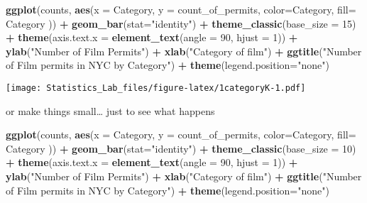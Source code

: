 \documentclass[
]{book}
\newenvironment{Shaded}{\begin{snugshade}}{\end{snugshade}}
\newcommand{\AttributeTok}[1]{\textcolor[rgb]{0.13,0.29,0.53}{#1}}
\newcommand{\DecValTok}[1]{\textcolor[rgb]{0.00,0.00,0.81}{#1}}
\newcommand{\FunctionTok}[1]{\textcolor[rgb]{0.13,0.29,0.53}{\textbf{#1}}}
\newcommand{\NormalTok}[1]{#1}
\newcommand{\SpecialCharTok}[1]{\textcolor[rgb]{0.81,0.36,0.00}{\textbf{#1}}}
\newcommand{\StringTok}[1]{\textcolor[rgb]{0.31,0.60,0.02}{#1}}
\begin{document}
\begin{Shaded}
\begin{Highlighting}[]
\FunctionTok{ggplot}\NormalTok{(counts, }\FunctionTok{aes}\NormalTok{(}\AttributeTok{x =}\NormalTok{ Category, }\AttributeTok{y =}\NormalTok{ count\_of\_permits, }
                   \AttributeTok{color=}\NormalTok{Category, }
                   \AttributeTok{fill=}\NormalTok{ Category )) }\SpecialCharTok{+}
  \FunctionTok{geom\_bar}\NormalTok{(}\AttributeTok{stat=}\StringTok{"identity"}\NormalTok{) }\SpecialCharTok{+} 
  \FunctionTok{theme\_classic}\NormalTok{(}\AttributeTok{base\_size =} \DecValTok{15}\NormalTok{) }\SpecialCharTok{+}
  \FunctionTok{theme}\NormalTok{(}\AttributeTok{axis.text.x =} \FunctionTok{element\_text}\NormalTok{(}\AttributeTok{angle =} \DecValTok{90}\NormalTok{, }\AttributeTok{hjust =} \DecValTok{1}\NormalTok{)) }\SpecialCharTok{+}
  \FunctionTok{ylab}\NormalTok{(}\StringTok{"Number of Film Permits"}\NormalTok{) }\SpecialCharTok{+} 
  \FunctionTok{xlab}\NormalTok{(}\StringTok{"Category of film"}\NormalTok{) }\SpecialCharTok{+}
  \FunctionTok{ggtitle}\NormalTok{(}\StringTok{"Number of Film permits in NYC by Category"}\NormalTok{) }\SpecialCharTok{+}
  \FunctionTok{theme}\NormalTok{(}\AttributeTok{legend.position=}\StringTok{"none"}\NormalTok{) }
\end{Highlighting}
\end{Shaded}

\texttt{[image: Statistics\_Lab\_files/figure-latex/1categoryK-1.pdf]}

or make things small\ldots{} just to see what happens

\begin{Shaded}
\begin{Highlighting}[]
\FunctionTok{ggplot}\NormalTok{(counts, }\FunctionTok{aes}\NormalTok{(}\AttributeTok{x =}\NormalTok{ Category, }\AttributeTok{y =}\NormalTok{ count\_of\_permits, }
                   \AttributeTok{color=}\NormalTok{Category, }
                   \AttributeTok{fill=}\NormalTok{ Category )) }\SpecialCharTok{+}
  \FunctionTok{geom\_bar}\NormalTok{(}\AttributeTok{stat=}\StringTok{"identity"}\NormalTok{) }\SpecialCharTok{+} 
  \FunctionTok{theme\_classic}\NormalTok{(}\AttributeTok{base\_size =} \DecValTok{10}\NormalTok{) }\SpecialCharTok{+}
  \FunctionTok{theme}\NormalTok{(}\AttributeTok{axis.text.x =} \FunctionTok{element\_text}\NormalTok{(}\AttributeTok{angle =} \DecValTok{90}\NormalTok{, }\AttributeTok{hjust =} \DecValTok{1}\NormalTok{)) }\SpecialCharTok{+}
  \FunctionTok{ylab}\NormalTok{(}\StringTok{"Number of Film Permits"}\NormalTok{) }\SpecialCharTok{+} 
  \FunctionTok{xlab}\NormalTok{(}\StringTok{"Category of film"}\NormalTok{) }\SpecialCharTok{+}
  \FunctionTok{ggtitle}\NormalTok{(}\StringTok{"Number of Film permits in NYC by Category"}\NormalTok{) }\SpecialCharTok{+}
  \FunctionTok{theme}\NormalTok{(}\AttributeTok{legend.position=}\StringTok{"none"}\NormalTok{) }
\end{Highlighting}
\end{Shaded}
\end{document}
